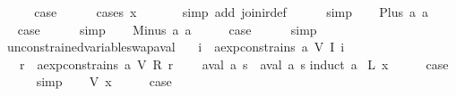 \begin{isabellebody}
\ \ \isamarkupfalse%
\ \isamarkupfalse%
\ {\isacharquery}case\isanewline
\ \ \ \ \isamarkupfalse%
\ {\isacharparenleft}cases\ x{\isacharparenright}\isanewline
\ \ \ \ \ \isamarkupfalse%
\ {\isacharparenleft}simp\ add{\isacharcolon}\ join{\isacharunderscore}ir{\isacharunderscore}def{\isacharparenright}\isanewline
\ \ \ \ \isamarkupfalse%
\ simp\isanewline
{}\isamarkupfalse%
\isanewline
\ \ \isamarkupfalse%
\ {\isacharparenleft}Plus\ a{}\ a{}{\isacharparenright}\isanewline
\ \ \isamarkupfalse%
\ \isamarkupfalse%
\ {\isacharquery}case\isanewline
\ \ \ \ \isamarkupfalse%
\ simp\isanewline
{}\isamarkupfalse%
\isanewline
\ \ \isamarkupfalse%
\ {\isacharparenleft}Minus\ a{}\ a{}{\isacharparenright}\isanewline
\ \ \isamarkupfalse%
\ \isamarkupfalse%
\ {\isacharquery}case\isanewline
\ \ \ \ \isamarkupfalse%
\ simp\isanewline
{}\isamarkupfalse%
%
\endisatagproof
{\isafoldproof}%
%
\isadelimproof
\isanewline
%
\endisadelimproof
\isanewline
{}\isamarkupfalse%
\ unconstrained{\isacharunderscore}variable{\isacharunderscore}swap{\isacharunderscore}aval{\isacharcolon}\ \isanewline
\ \ {\isachardoublequoteopen}{\isasymforall}i{\isachardot}\ {\isasymnot}\ aexp{\isacharunderscore}constrains\ a\ {\isacharparenleft}V\ {\isacharparenleft}I\ i{\isacharparenright}{\isacharparenright}\ {\isasymLongrightarrow}\isanewline
\ \ \ {\isasymforall}r{\isachardot}\ {\isasymnot}\ aexp{\isacharunderscore}constrains\ a\ {\isacharparenleft}V\ {\isacharparenleft}R\ r{\isacharparenright}{\isacharparenright}\ {\isasymLongrightarrow}\isanewline
\ \ \ aval\ a\ s\ {\isacharequal}\ aval\ a\ s{\isacharprime}{\isachardoublequoteclose}\isanewline
%
\isadelimproof
%
\endisadelimproof
%
\isatagproof
{}\isamarkupfalse%
{\isacharparenleft}induct\ a{\isacharparenright}\isanewline
{}\isamarkupfalse%
\ {\isacharparenleft}L\ x{\isacharparenright}\isanewline
\ \ \isamarkupfalse%
\ \isamarkupfalse%
\ {\isacharquery}case\isanewline
\ \ \ \ \isamarkupfalse%
\ simp\isanewline
{}\isamarkupfalse%
\isanewline
\ \ \isamarkupfalse%
\ {\isacharparenleft}V\ x{\isacharparenright}\isanewline
\ \ \isamarkupfalse%
\ \isamarkupfalse%
\ {\isacharquery}case\isanewline

\end{isabellebody}
